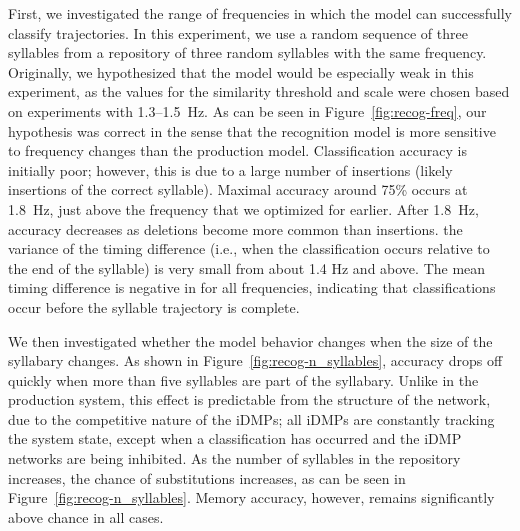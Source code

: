 First, we investigated the
range of frequencies in which the model
can successfully classify trajectories.
In this experiment, we use a random sequence
of three syllables from a
repository of three random syllables
with the same frequency.
Originally, we hypothesized that the
model would be especially weak in this experiment,
as the values for the similarity threshold
and scale were chosen based on
experiments with 1.3--1.5~Hz.
As can be seen in Figure~\ref{fig:recog-freq},
our hypothesis was correct in the sense that
the recognition model
is more sensitive to frequency changes
than the production model.
Classification accuracy is initially poor;
however, this is due to a large number
of insertions
(likely insertions of the correct syllable).
Maximal accuracy around 75\%
occurs at 1.8~Hz,
just above the frequency that we
optimized for earlier.
After 1.8~Hz, accuracy decreases
as deletions become more common
than insertions.
the variance of the timing difference
(i.e., when the classification occurs
relative to the end of the syllable)
is very small from about 1.4 Hz and above.
The mean timing difference
is negative in for all frequencies,
indicating that classifications
occur before the syllable trajectory
is complete.


We then investigated whether the model
behavior changes when the size
of the syllabary changes.
As shown in Figure~\ref{fig:recog-n_syllables},
accuracy drops off quickly when
more than five syllables
are part of the syllabary.
Unlike in the production system,
this effect is predictable
from the structure of the network,
due to the competitive nature
of the iDMPs;
all iDMPs are constantly tracking
the system state,
except when a classification has occurred
and the iDMP networks are being inhibited.
As the number of syllables in the repository increases,
the chance of substitutions increases,
as can be seen in Figure~\ref{fig:recog-n_syllables}.
Memory accuracy, however, remains significantly
above chance in all cases.

